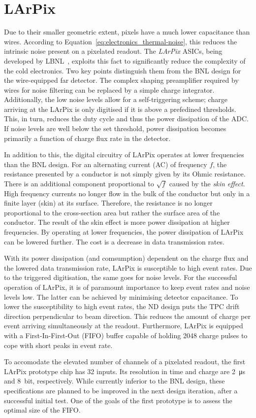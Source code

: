 \section{LArPix}
\label{sec:electronics_larpix}
Due to their smaller geometric extent, pixels have a much lower capacitance than wires.
According to Equation~\eqref{eq:electronics_thermal-noise}, this reduces the intrinsic noise present on a pixelated readout.
The \emph{LArPix} ASICs, being developed by LBNL~\cite{larpix}, exploits this fact to significantly reduce the complexity of the cold electronics.
Two key points distinguish them from the BNL design for the wire-equipped far detector.
The complex shaping preamplifier required by wires for noise filtering can be replaced by a simple charge integrator.
Additionally, the low noise levels allow for a self-triggering scheme; charge arriving at the LArPix is only digitised if it is above a prefedined thresholds.
This, in turn, reduces the duty cycle and thus the power dissipation of the ADC.
If noise levels are well below the set threshold, power dissipation becomes primarily a function of charge flux rate in the detector.

In addition to this, the digital circuitry of LArPix operates at lower frequencies than the BNL design.
For an alternating current (AC) of frequency $f$, the resistance presented by a conductor is not simply given by its Ohmic resistance.
There is an additional component proportional to $\sqrt{f}$ caused by the \emph{skin effect}.~\cite{horowitzHill}
High frequency currents no longer flow in the bulk of the conductor but only in a finite layer (skin) at its surface.
Therefore, the resistance is no longer proportional to the cross-section area but rather the surface area of the conductor.
The result of the skin effect is more power dissipation at higher frequencies.
By operating at lower frequencies, the power dissipation of LArPix can be lowered further.
The cost is a decrease in data transmission rates.

With its power dissipation (and comsumption) dependent on the charge flux and the lowered data transmission rate, LArPix is susceptible to high event rates.
Due to the triggered digitisation, the same goes for noise levels.
For the successful operation of LArPix, it is of paramount importance to keep event rates and noise levels low.
The latter can be achieved by minimising detector capacitance.
To lower the susceptibility to high event rates, the \dune{} ND design puts the TPC drift direction perpendicular to beam direction.
This reduces the amount of charge per event arriving simultaneously at the readout.
Furthermore, LArPix is equipped with a First-In-First-Out (FIFO) buffer capable of holding \num{2048} charge pulses to cope with short peaks in event rate.

To accomodate the elevated number of channels of a pixelated readout, the first LArPix prototype chip has \num{32} inputs.
Its resolution in time and charge are \SI{2}{\micro\second} and \SI{8}{bit}, respectively.
While currently inferior to the BNL design, these specifications are planned to be improved in the next design iteration, after a successful initial test.
One of the goals of the first prototype is to assess the optimal size of the FIFO.~\cite{danLarpix}